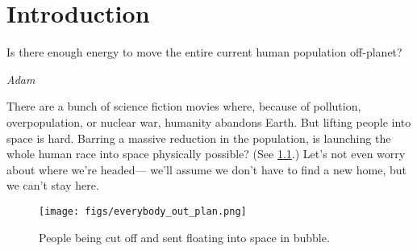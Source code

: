 
\chapter{Introduction}
\label{chap:intro}

\epigraph{%
    Is there enough energy to move the entire current human population off-planet?
}{\textit{Adam}}

There are a bunch of science fiction movies where,
because of pollution, overpopulation, or nuclear war, humanity abandons Earth.
But lifting people into space is hard.
Barring a massive reduction in the population,
is launching the whole human race into space physically possible?
(See \cref{fig:the-plan}.)
Let's not even worry about where we're headed---%
we'll assume we don't have to find a new home, but we can't stay here.

\begin{figure}[hp]
\centering
\texttt{[image: figs/everybody\_out\_plan.png]}
\caption{
    People being cut off and sent floating into space in bubble.
}
\label{fig:the-plan}
\end{figure}

